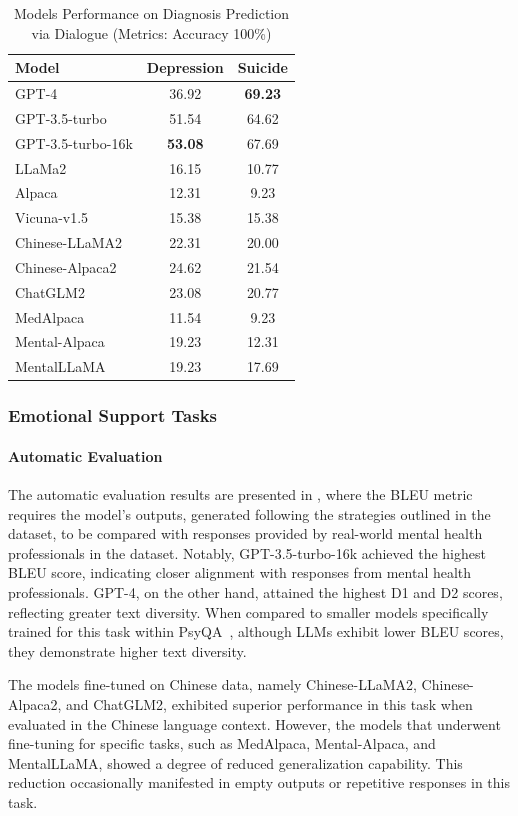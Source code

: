 \begin{table}[htpb]
\centering
\footnotesize
\begin{tabular}{l c c }
\hline
\textbf{Model} & \textbf{Depression} & \textbf{Suicide}\\
\hline
GPT-4 & 36.92 & \textbf{69.23}\\
GPT-3.5-turbo & 51.54 & 64.62\\
GPT-3.5-turbo-16k & \textbf{53.08} & 67.69\\
\hline
LLaMa2 & 16.15 & 10.77\\
Alpaca & 12.31 & 9.23\\
Vicuna-v1.5 & 15.38 & 15.38\\
\hline
Chinese-LLaMA2 & 22.31 & 20.00\\
Chinese-Alpaca2 & 24.62 & 21.54\\
ChatGLM2 & 23.08 & 20.77\\
\hline
MedAlpaca & 11.54 & 9.23\\
Mental-Alpaca & 19.23 & 12.31\\
MentalLLaMA & 19.23 & 17.69\\
\hline
\end{tabular}
\caption{Models Performance on Diagnosis Prediction via Dialogue (Metrics: Accuracy 100\%)}
\label{tab: D4}
\end{table}

\subsubsection{Emotional Support Tasks}
\paragraph{Automatic Evaluation} The automatic evaluation results are presented in , where the BLEU metric requires the model's outputs, generated following the strategies outlined in the dataset, to be compared with responses provided by real-world mental health professionals in the dataset. Notably, GPT-3.5-turbo-16k achieved the highest BLEU score, indicating closer alignment with responses from mental health professionals. GPT-4, on the other hand, attained the highest D1 and D2 scores, reflecting greater text diversity. When compared to smaller models specifically trained for this task within PsyQA~\citep{sun-etal-2021-psyqa}, although LLMs exhibit lower BLEU scores, they demonstrate higher text diversity.

The models fine-tuned on Chinese data, namely Chinese-LLaMA2, Chinese-Alpaca2, and ChatGLM2, exhibited superior performance in this task when evaluated in the Chinese language context. However, the models that underwent fine-tuning for specific tasks, such as MedAlpaca, Mental-Alpaca, and MentalLLaMA, showed a degree of reduced generalization capability. This reduction occasionally manifested in empty outputs or repetitive responses in this task.

